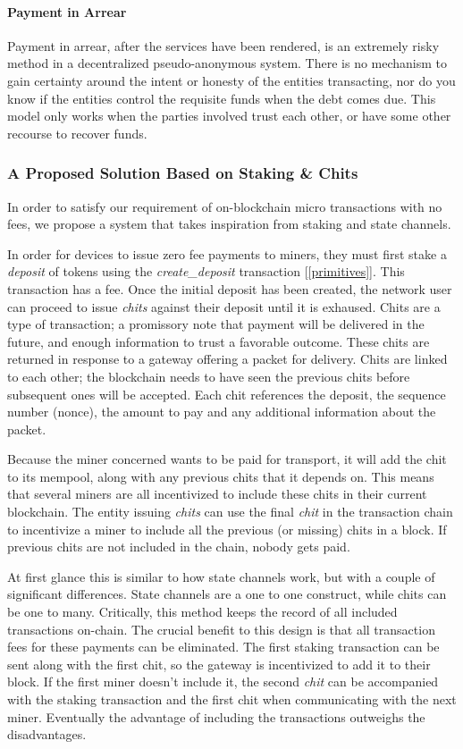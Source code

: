 \documentclass[UTF8, 10pt, nonatbib, nocopyrightspace, reprint]{sigplanconf}
\newcommand{\secref}[1]{[\autoref{#1}]}
\begin{document}
\paragraph{Payment in Arrear}
Payment in arrear, after the services have been rendered, is an extremely risky method in a decentralized pseudo-anonymous system. There is no mechanism to gain certainty around the intent or honesty of the entities transacting, nor do you know if the entities control the requisite funds when the debt comes due. This model only works when the parties involved trust each other, or have some other recourse to recover funds.

\subsubsection{A Proposed Solution Based on Staking \& Chits}

In order to satisfy our requirement of on-blockchain micro transactions with no fees, we propose a system that takes inspiration from staking and state channels.

In order for devices to issue zero fee payments to miners, they must first stake a \emph{deposit} of tokens using the \emph{create\_deposit} transaction \secref{primitives}. This transaction has a fee. Once the initial deposit has been created, the network user can proceed to issue \emph{chits} against their deposit until it is exhaused. Chits are a type of transaction; a promissory note that payment will be delivered in the future, and enough information to trust a favorable outcome. These chits are returned in response to a gateway offering a packet for delivery. Chits are linked to each other; the blockchain needs to have seen the previous chits before subsequent ones will be accepted. Each chit references the deposit, the sequence number (nonce), the amount to pay and any additional information about the packet.

Because the miner concerned wants to be paid for transport, it will add the chit to its mempool, along with any previous chits that it depends on. This means that several miners are all incentivized to include these chits in their current blockchain. The entity issuing \emph{chits} can use the final \emph{chit} in the transaction chain to incentivize a miner to include all the previous (or missing) chits in a block. If previous chits are not included in the chain, nobody gets paid.

At first glance this is similar to how state channels work, but with a couple of significant differences. State channels are a one to one construct, while chits can be one to many. Critically, this method keeps the record of all included transactions on-chain. The crucial benefit to this design is that all transaction fees for these payments can be eliminated. The first staking transaction can be sent along with the first chit, so the gateway is incentivized to add it to their block. If the first miner doesn't include it, the second \emph{chit} can be accompanied with the staking transaction and the first chit when communicating with the next miner. Eventually the advantage of including the transactions outweighs the disadvantages.
\end{document}
